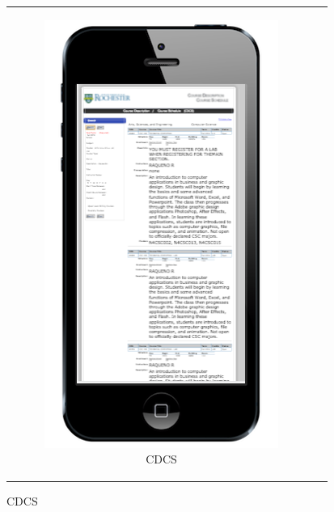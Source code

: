 \begin{figure}[ht]
  \centering
  \vspace{10pt}
  \begin{tabular}{c c}
    \begin{subfigure}[h]{4.5cm}
      \centering
      \includegraphics[width=1.00\textwidth]{images/cdcs/mobile}
      \caption{CDCS} \label{fig:cdcs-mobile}
    \end{subfigure}

\end{tabular}
\end{figure}

